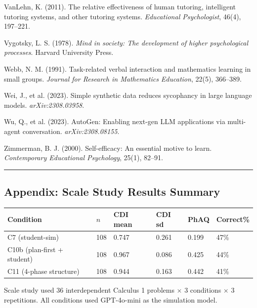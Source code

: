 \documentclass[
  11pt,
]{article}
\newcounter{none} %
\begin{document}
VanLehn, K. (2011). The relative effectiveness of human tutoring, intelligent tutoring systems, and other tutoring systems. \emph{Educational Psychologist}, 46(4), 197--221.

Vygotsky, L. S. (1978). \emph{Mind in society: The development of higher psychological processes}. Harvard University Press.

Webb, N. M. (1991). Task-related verbal interaction and mathematics learning in small groups. \emph{Journal for Research in Mathematics Education}, 22(5), 366--389.

Wei, J., et al. (2023). Simple synthetic data reduces sycophancy in large language models. \emph{arXiv:2308.03958}.

Wu, Q., et al. (2023). AutoGen: Enabling next-gen LLM applications via multi-agent conversation. \emph{arXiv:2308.08155}.

Zimmerman, B. J. (2000). Self-efficacy: An essential motive to learn. \emph{Contemporary Educational Psychology}, 25(1), 82--91.

\begin{center}\rule{0.5\linewidth}{0.5pt}\end{center}

\subsection{Appendix: Scale Study Results Summary}\label{appendix-scale-study}

{\def\LTcaptype{none} %
\begin{longtable}[]{@{}llllll@{}}
\toprule\noalign{}
Condition & $n$ & CDI mean & CDI sd & PhAQ & Correct\% \\
\midrule\noalign{}
\endhead
\bottomrule\noalign{}
\endlastfoot
C7 (student-sim) & 108 & 0.747 & 0.261 & 0.199 & 47\% \\
C10b (plan-first + student) & 108 & 0.967 & 0.086 & 0.425 & 44\% \\
C11 (4-phase structure) & 108 & 0.944 & 0.163 & 0.442 & 41\% \\
\end{longtable}
}

Scale study used 36 interdependent Calculus 1 problems $\times$ 3 conditions $\times$ 3 repetitions. All conditions used GPT-4o-mini as the simulation model.
\end{document}

